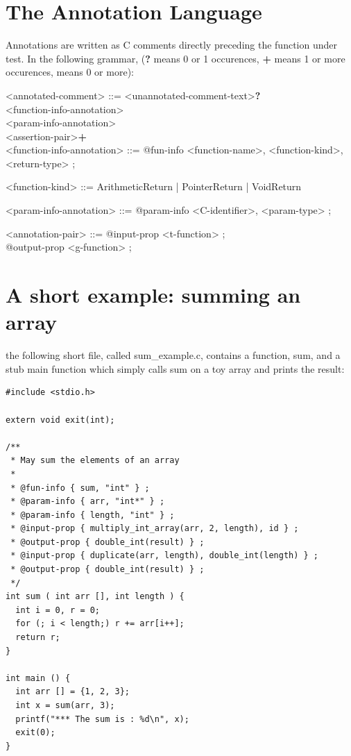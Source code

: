 \documentclass[notitlepage]{article}
\begin{document}
\section{The Annotation Language}

Annotations are written as C comments directly preceding the function under test. In the following grammar, ({\bf ?} means 0 or 1 occurences, {\bf +} means 1 or more occurences, {\bf *} means 0 or more{\bf}):

\ttfamily

<annotated-comment> ::= <unannotated-comment-text>{\bf ?} \\
\phantom{1}\hspace{120pt}<function-info-annotation> \\
\phantom{1}\hspace{120pt}<param-info-annotation>{\bf *} \\
\phantom{1}\hspace{120pt}<assertion-pair>{\bf +} \\

<function-info-annotation> ::= @fun-info { <function-name>, <function-kind>, <return-type> } ;

<function-kind> ::= ArithmeticReturn | PointerReturn | VoidReturn

<param-info-annotation> ::= @param-info { <C-identifier>, <param-type> } ;

<annotation-pair> ::= @input-prop <t-function>{\bf *} ; \\
\phantom{1}\hspace{110pt}@output-prop <g-function> ;

\rmfamily

\section{A short example: summing an array}

the following short file, called sum\_example.c, contains a function, sum, and a stub main function which simply calls sum on a toy array and prints the result:

\begin{verbatim}
#include <stdio.h>

extern void exit(int);

/**
 * May sum the elements of an array
 *
 * @fun-info { sum, "int" } ;
 * @param-info { arr, "int*" } ;
 * @param-info { length, "int" } ;
 * @input-prop { multiply_int_array(arr, 2, length), id } ;
 * @output-prop { double_int(result) } ;
 * @input-prop { duplicate(arr, length), double_int(length) } ;
 * @output-prop { double_int(result) } ;
 */
int sum ( int arr [], int length ) {
  int i = 0, r = 0;
  for (; i < length;) r += arr[i++];
  return r;
}

int main () {
  int arr [] = {1, 2, 3};
  int x = sum(arr, 3);
  printf("*** The sum is : %d\n", x);
  exit(0);
}
\end{verbatim}
\end{document}
